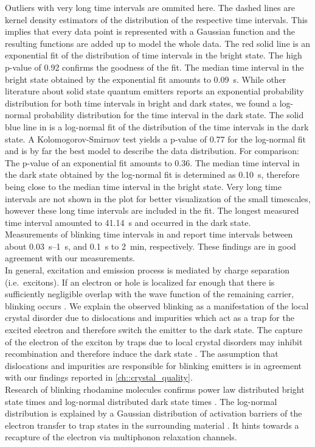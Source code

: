 		Outliers with very long time intervals are ommited here.
		The dashed lines are kernel density estimators of the distribution of the respective time intervals.
		This implies that every data point is represented with a Gaussian function and the resulting functions are added up to model the whole data.
		The red solid line is an exponential fit of the distribution of time intervals in the bright state.
		The high p-value of \num{0.92} confirms the goodness of the fit.
		The median time interval in the bright state obtained by the exponential fit amounts to \SI[separate-uncertainty]{0.09}{s}.
		While other literature about solid state quantum emitters reports an exponential probability distribution for both time intervals in bright and dark states\cite{Bradac2010,Berhane2017}, we found a log-normal probability distribution for the time interval in the dark state.
		The solid blue line in  is a log-normal fit of the distribution of the time intervals in the dark state.
		A Kolomogorov-Smirnov test yields a p-value of \num{0.77} for the log-normal fit and is by far the best model to describe the data distribution.
		For comparison: The p-value of an exponential fit amounts to \num{0.36}.
		The median time interval in the dark state obtained by the log-normal fit is determined as \SI{0.10}{s}, therefore being close to the median time interval in the bright state.
		Very long time intervals are not shown in the plot for better visualization of the small timescales, however these long time intervals are included in the fit.
		The longest measured time interval amounted to \SI{41.14}{s} and occurred in the dark state.
		\\
		Measurements of blinking time intervals in \cite{Jantzen2016} and \cite{Neu2012a} report time intervals between about \SIrange{0.03}{1}{s}, and \SI{0.1}{s} to \SI{2}{min}, respectively.
		These findings are in good agreement with our measurements.
		\\
		In general, excitation and emission process is mediated by charge separation (i.e.\ excitons).
		If an electron or hole is localized far enough that there is sufficiently negligible overlap with the wave function of the remaining carrier, blinking occurs \cite{Efros2016}.
		We explain the observed blinking as a manifestation of the local crystal disorder due to dislocations and impurities which act as a trap for the excited electron and therefore switch the emitter to the dark state.
		The capture of the electron of the exciton by traps due to local crystal disorders may inhibit recombination and therefore induce the dark state \cite{Bradac2010}.
		The assumption that dislocations and impurities are responsible for blinking emitters is in agreement with our findings reported in \ref{ch::crystal_quality}.
		\\
		Research of blinking rhodamine molecules confirms power law distributed bright state times and log-normal distributed dark state times \cite{Wong2013}.
		The log-normal distribution is explained by a Gaussian distribution of activation barriers of the electron transfer to trap states in the surrounding material \cite{Albery1985}.
		It hints towards a recapture of the electron via multiphonon relaxation channels.
